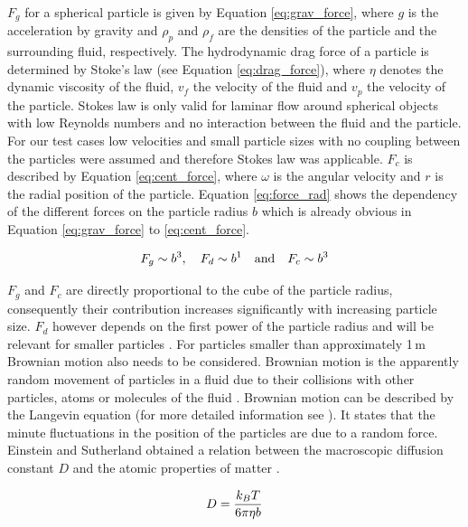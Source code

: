 $F_{g}$ for a spherical particle is given by Equation \ref{eq:grav_force}, where $g$ is the acceleration by gravity and $\rho_{p}$ and $\rho_{f}$ are the densities of the particle and the surrounding fluid, respectively. The hydrodynamic drag force of a particle is determined by Stoke's law (see Equation \ref{eq:drag_force}), where $\eta$ denotes the dynamic viscosity of the fluid, $v_{f}$ the velocity of the fluid and $v_{p}$ the velocity of the particle. Stokes law is only valid for laminar flow around spherical objects with low Reynolds numbers and no interaction between the fluid and the particle. For our test cases low velocities and small particle sizes with no coupling between the particles were assumed and therefore Stokes law was applicable. $F_{c}$ is described by Equation \ref{eq:cent_force}, where $\omega$ is the angular velocity and $r$ is the radial position of the particle. Equation \ref{eq:force_rad} shows the dependency of the different forces on the particle radius $b$ which is already obvious in Equation \ref{eq:grav_force} to \ref{eq:cent_force}. 

\begin{equation}
\label{eq:force_rad}
\centering
F_{g}\sim b^{3}, \quad F_{d}\sim b^{1} \quad \textrm{and} \quad F_{c}\sim b^{3}
\end{equation}

$F_{g}$ and $F_{c}$ are directly proportional to the cube of the particle radius, consequently their contribution increases significantly with increasing particle size. $F_{d}$ however depends on the first power of the particle radius and will be relevant for smaller particles \cite{svoboda2004magnetic,oberteuffer1974magnetic}. For particles smaller than approximately 1\,\textmu m Brownian motion also needs to be considered. Brownian motion is the apparently random movement of particles in a fluid due to their collisions with other particles, atoms or molecules of the fluid \cite{brown1828xxvii}. Brownian motion can be described by the   
Langevin equation (for more detailed information see \cite{Langevin,BrownianDynamics,BrownianModel}). It states that the minute fluctuations in the position of the particles are due to a random force. Einstein and Sutherland obtained a relation between the macroscopic diffusion constant $D$ and the atomic properties of matter \cite{einstein1906theorie,einstein1905molekularkinetischen,sutherland1905lxxv}. 

\begin{equation}
\label{eq:Stokes_Einstein}
\centering
D = \frac{k_{B}T}{6\pi\eta b}
\end{equation}

